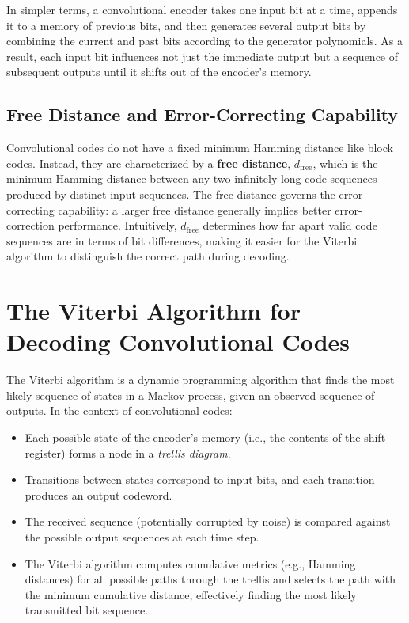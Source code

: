 \documentclass[12pt,a4paper]{article}
\begin{document}
In simpler terms, a convolutional encoder takes one input bit at a time, appends it to a memory of previous bits, and then generates several output bits by combining the current and past bits according to the generator polynomials. As a result, each input bit influences not just the immediate output but a sequence of subsequent outputs until it shifts out of the encoder's memory.

\subsection{Free Distance and Error-Correcting Capability}

Convolutional codes do not have a fixed minimum Hamming distance like block codes. Instead, they are characterized by a \textbf{free distance}, $d_{\text{free}}$, which is the minimum Hamming distance between any two infinitely long code sequences produced by distinct input sequences. The free distance governs the error-correcting capability: a larger free distance generally implies better error-correction performance. Intuitively, $d_{\text{free}}$ determines how far apart valid code sequences are in terms of bit differences, making it easier for the Viterbi algorithm to distinguish the correct path during decoding.

\section{The Viterbi Algorithm for Decoding Convolutional Codes}

The Viterbi algorithm is a dynamic programming algorithm that finds the most likely sequence of states in a Markov process, given an observed sequence of outputs. In the context of convolutional codes:
\begin{itemize}
    \item Each possible state of the encoder's memory (i.e., the contents of the shift register) forms a node in a \emph{trellis diagram}.
    \item Transitions between states correspond to input bits, and each transition produces an output codeword.
    \item The received sequence (potentially corrupted by noise) is compared against the possible output sequences at each time step.
    \item The Viterbi algorithm computes cumulative metrics (e.g., Hamming distances) for all possible paths through the trellis and selects the path with the minimum cumulative distance, effectively finding the most likely transmitted bit sequence.
\end{itemize}
\end{document}
